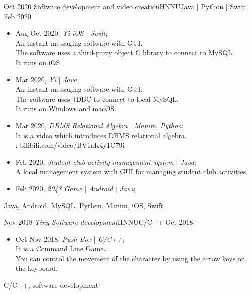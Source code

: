 \begin{experiences}
  \emptySeparator
  \experience
  {Oct 2020} {Software development and video creation}{HNNU}{Java | Python | Swift}
  {Feb 2020}    		{
				  	\begin{itemize}
						\item  Aug-Oct 2020, \emph{Yi-iOS} | \emph{Swift};\\
						An instant messaging software with GUI.\\
						The software uses a third-party object C library to connect to MySQL.\\
						It runs on iOS.\\
				  		\item  Mar 2020, \emph{Yi} | \emph{Java};\\
						An instant messaging software with GUI.\\
						The software uses JDBC to connect to local MySQL.\\
						It runs on Windows and macOS.\\
				  		\item  Mar 2020, \emph{DBMS Relational Algebra} | \emph{Manim}, \emph{Python};\\
						It is a video which introduces DBMS relational algebra.\\
						\faLink:  {bilibili.com/video/BV1aK4y1C79i}\\
				  		\item  Feb 2020, \emph{Student club activity management system} | \emph{Java};\\
						A local management system with GUI for managing student club activities.\\
				  		\item  Feb 2020, \emph{2048 Game} | \emph{Android} | \emph{Java};\\
				  	\end{itemize}
				  }
				  {Java, Android, MySQL, Python, Manim, iOS, Swift}
				  
  \emptySeparator
  \experience
  { Nov 2018} {\emph{Tiny Software development}}{HNNU}{C/C++}
  { Oct 2018}		{
				  	\begin{itemize}                                                                       
				  		\item Oct-Nov 2018, \emph{Push Box} | \emph{C/C++};\\
						It is a Command Line Game.\\
						You can control the movement of the character by using the arrow keys on the keyboard.\\
				  	\end{itemize}
				  }
				  {C/C++, software development}
				  
\end{experiences}
